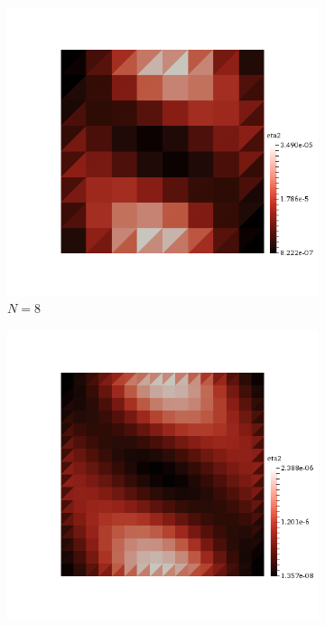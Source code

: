 \begin{figure}[h!]
  \centering
  \begin{subfigure}[b]{0.24\textwidth}
    \includegraphics[width=\textwidth,height=\textheight,keepaspectratio,height=\textheight,keepaspectratio]{figures/2_mpet/biomedical/space/eta2_8.png}
    \caption{$N=8$}
  \end{subfigure}
  \begin{subfigure}[b]{0.24\textwidth}
    \includegraphics[width=\textwidth,height=\textheight,keepaspectratio,height=\textheight,keepaspectratio]{figures/2_mpet/biomedical/space/eta2_16.png}

\end{subfigure}
\end{figure}
